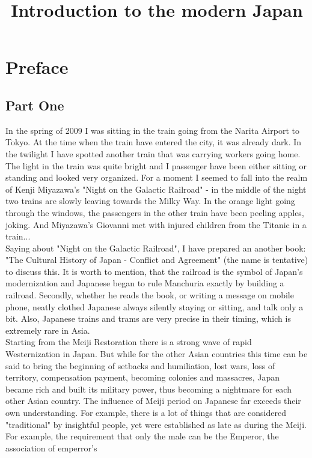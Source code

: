 \documentclass[11pt]{book}
\title{Introduction to the modern Japan}
\begin{document}
\maketitle
\section*{Preface}
\subsection*{Part One}
In the spring of 2009 I was sitting in the train going from the Narita Airport to Tokyo. At the time when the train have entered the city, it was
already dark. In the twilight I have spotted another train that was carrying workers going home. The light in the train was quite bright and I
passenger have been either sitting or standing and looked very organized. For a moment I seemed to fall into the realm of Kenji Miyazawa's "Night
on the Galactic Railroad" - in the middle of the night two trains are slowly leaving towards the Milky Way. In the orange light going through the windows, the passengers in the other train have been peeling apples,
joking. And Miyazawa's Giovanni met with injured children from the Titanic in a train...\\
Saying about "Night on the Galactic Railroad", I have prepared an another book: "The Cultural History of Japan - Conflict and Agreement" (the name is tentative) to discuss this. It is worth to mention, that the railroad is
the symbol of Japan's modernization and Japanese began to rule Manchuria exactly by building a railroad. Secondly, whether he reads the book, or writing a message on mobile phone, neatly clothed Japanese always silently staying or
sitting, and talk only a bit. Also, Japanese trains and trams are very precise in their timing, which is extremely rare in Asia.\\
Starting from the Meiji Restoration there is a strong wave of rapid Westernization in Japan. But while for the other Asian countries this time
can be said to bring the beginning of setbacks and humiliation, lost wars, loss of territory, compensation payment, becoming colonies and
massacres, Japan became rich and built its military power, thus becoming a nightmare for each other Asian country. The influence of Meiji period
on Japanese far exceeds their own understanding. For example, there is a lot of things that are considered "traditional" by insightful people,
yet were established as late as during the Meiji. For example, the requirement that only the male can be the Emperor, the association of emperror's
\end{document}
